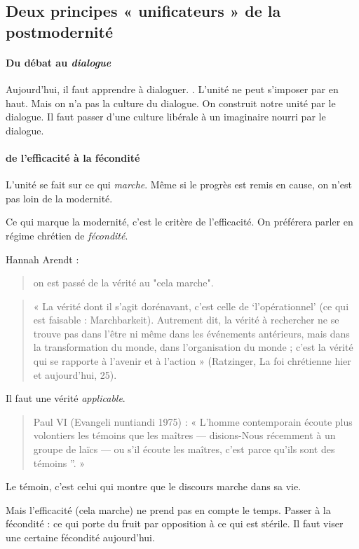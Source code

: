 \subsection{Deux principes « unificateurs » de la postmodernité}

\paragraph{Du débat au \textit{dialogue}} Aujourd'hui, il faut apprendre à dialoguer. . L'unité ne peut s'imposer par en haut. Mais on n'a pas la culture du dialogue. On construit notre unité par le dialogue. Il faut passer d'une culture libérale à un imaginaire nourri par le dialogue. 

\paragraph{de l'efficacité à la fécondité} L'unité se fait sur ce qui \textit{marche}. Même si le progrès est remis en cause, on n'est pas loin de la modernité. 
\begin{Prop}
Ce qui marque la modernité, c'est le critère de l'efficacité. On préférera parler en régime chrétien de \textit{fécondité}.
\end{Prop}
Hannah Arendt : 
\begin{quote}
    on est passé de la vérité au "cela marche".
\end{quote}
\begin{quote}
    « La vérité dont il s’agit dorénavant, c’est celle de ‘l’opérationnel’ (ce qui est faisable : Marchbarkeit). Autrement dit, la vérité à rechercher ne se trouve pas dans l’être ni même dans les événements antérieurs, mais dans la transformation du monde, dans l’organisation du monde ; c’est la vérité qui se rapporte à l’avenir et à l’action » (Ratzinger, La foi chrétienne
hier et aujourd’hui, 25).
\end{quote}
Il faut une vérité \textit{applicable}. 
\begin{quote}
    Paul VI (Evangeli nuntiandi 1975) : « L’homme contemporain écoute plus volontiers les
témoins que les maîtres — disions-Nous récemment à un groupe de laïcs — ou s’il écoute les
maîtres, c’est parce qu’ils sont des témoins ”. »
\end{quote}
Le témoin, c'est celui qui montre que le discours marche dans sa vie. 

Mais l'efficacité (cela marche) ne prend pas en compte le temps. Passer à la fécondité : ce qui porte du fruit par opposition à ce qui est stérile. Il faut viser une certaine fécondité aujourd'hui. 

